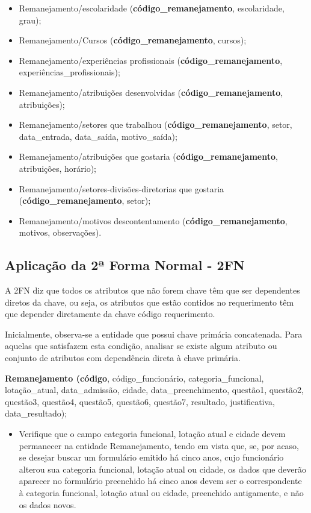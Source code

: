 \documentclass{article}
\begin{document}
\begin{itemize}
    \item Remanejamento/escolaridade (\textbf{código\_remanejamento}, escolaridade, grau);
    \item Remanejamento/Cursos (\textbf{código\_remanejamento}, cursos);
    \item Remanejamento/experiências profissionais (\textbf{código\_remanejamento}, experiências\_profissionais);
    \item Remanejamento/atribuições desenvolvidas (\textbf{código\_remanejamento}, atribuições);
    \item Remanejamento/setores que trabalhou (\textbf{código\_remanejamento}, setor, data\_entrada, data\_saída, motivo\_saída); 
    \item Remanejamento/atribuições que gostaria (\textbf{código\_remanejamento}, atribuições, horário);
    \item Remanejamento/setores-divisões-diretorias que gostaria (\textbf{código\_remanejamento}, setor);
    \item Remanejamento/motivos descontentamento (\textbf{código\_remanejamento}, motivos, observações).
\end{itemize}

\subsection{Aplicação da 2ª Forma Normal - 2FN}
A 2FN diz que todos os atributos que não forem chave têm que ser dependentes diretos da chave, ou seja, os atributos que estão contidos no requerimento têm que depender diretamente da chave código requerimento.

Inicialmente, observa-se a entidade que possui chave primária concatenada. Para aquelas que satisfazem esta condição, analisar se existe algum atributo ou conjunto de atributos com dependência direta à chave primária.

\textbf{Remanejamento (código}, código\_funcionário, categoria\_funcional, lotação\_atual, data\_admissão, cidade, data\_preenchimento, questão1, questão2, questão3, questão4, questão5, questão6, questão7, resultado, justificativa, data\_resultado);
\begin{itemize}
    \begin{itemize}
        \item Verifique que o campo categoria funcional, lotação atual e cidade devem permanecer na entidade Remanejamento, tendo em vista que, se, por acaso, se desejar buscar um formulário emitido há cinco anos, cujo funcionário alterou sua categoria funcional, lotação atual ou cidade, os dados que deverão aparecer no formulário preenchido há cinco anos devem ser o correspondente à categoria funcional, lotação atual ou cidade, preenchido antigamente, e não os dados novos.
    \end{itemize}
\end{itemize}
\end{document}
